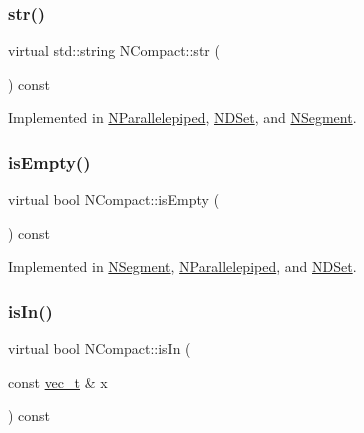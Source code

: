 \subsubsection{\texorpdfstring{str()}{str()}}
{\footnotesize\ttfamily virtual std\+::string N\+Compact\+::str (\begin{DoxyParamCaption}{ }\end{DoxyParamCaption}) const\hspace{0.3cm}{\ttfamily [pure virtual]}}



Implemented in \mbox{\hyperlink{class_n_parallelepiped_a2f5b58b9b80e9b3fda4177fb7703b221}{N\+Parallelepiped}}, \mbox{\hyperlink{class_n_d_set_ada343b5d74ced1894dfe098c6324d61e}{N\+D\+Set}}, and \mbox{\hyperlink{class_n_segment_a15514dec8420dd1aafda38e7327c9be0}{N\+Segment}}.

\mbox{\label{class_n_compact_a574764d7ac4fe2393a739b67bf57a7f1}} 
\subsubsection{\texorpdfstring{isEmpty()}{isEmpty()}}
{\footnotesize\ttfamily virtual bool N\+Compact\+::is\+Empty (\begin{DoxyParamCaption}{ }\end{DoxyParamCaption}) const\hspace{0.3cm}{\ttfamily [pure virtual]}}



Implemented in \mbox{\hyperlink{class_n_segment_ac17e9542c20477269bbcf08286d79d07}{N\+Segment}}, \mbox{\hyperlink{class_n_parallelepiped_a7c4271e0cd8678b6904b1f25d116cd57}{N\+Parallelepiped}}, and \mbox{\hyperlink{class_n_d_set_aafdebcaf09b5efa04872041e4449190c}{N\+D\+Set}}.

\mbox{\label{class_n_compact_a387e86914973c69b292782f640368680}} 
\subsubsection{\texorpdfstring{isIn()}{isIn()}}
{\footnotesize\ttfamily virtual bool N\+Compact\+::is\+In (\begin{DoxyParamCaption}\item[{const \mbox{\hyperlink{_n_vector_8h_a0a2cfc67e738a3d73e4f12098c4c07f6}{vec\+\_\+t}} \&}]{x }\end{DoxyParamCaption}) const\hspace{0.3cm}{\ttfamily [pure virtual]}}



